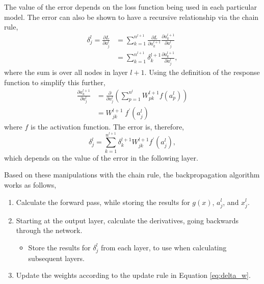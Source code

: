 \noindent
The value of the error depends on the loss function being used in each 
particular model. The error can also be shown to have a recursive relationship 
via the chain rule,
\begin{align*}
		\delta^l_j = \frac{\partial L}{\partial a^l_j} &= \sum_{k=1}^{n^{l+1}} 
		\frac{\partial L}{\partial a^{l+1}_{k}}\frac{\partial a^{l+1}_k}{\partial 
		a^l_j}\\ 
		&= \sum^{n^{l+1}}_{k = 1} \delta^{l+1}_k \frac{\partial a^{l+1}_k}{\partial 
		a^l_j},
\end{align*}
where the sum is over all nodes in layer $l+1$. Using the definition of the 
response function to simplify this further,
\begin{align*}
		\frac{\partial a^{l+1}_k}{\partial a^l_j} &= \frac{\partial}{\partial a^l_j} 
		\left( \sum^{n^l}_{p=1} W^{l+1}_{pk} f(a^l_p) \right) \\ 
		&= W^{l+1}_{jk} \; f^\prime(a^l_j)
\end{align*}
where $f$ is the activation function. The error is, therefore,
\begin{equation*}
	\delta^l_j = \sum^{n^{l+1}}_{k=1} \delta^{l+1}_k W^{l+1}_{jk} f^\prime(a^l_j),
\end{equation*}
which depends on the value of the error in the following layer.

Based on these manipulations with the chain rule, the backpropagation 
algorithm works as follows,
\begin{enumerate}
	\item Calculate the forward pass, while storing the results for $g(x)$, 
		$a^l_j$, and $x^l_j$.
	\item Starting at the output layer, calculate the derivatives, going backwards
		through the network. 
	\begin{itemize}
		\item Store the results for $\delta^l_j$ from each layer, to use when 
			calculating subsequent layers.
	\end{itemize}
	\item Update the weights according to the update rule in Equation 
		\ref{eq:delta_w}.
\end{enumerate}

